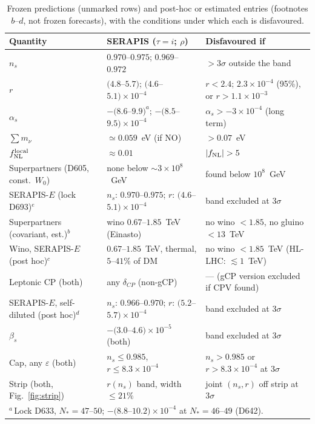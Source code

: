 \documentclass[aps,prd,twocolumn,superscriptaddress,nofootinbib,floatfix]{revtex4-2}
\begin{document}
\begin{table}[tbp]
\caption{Frozen predictions (unmarked rows) and post-hoc or estimated entries (footnotes $b$--$d$, not frozen forecasts), with the conditions under which each is disfavoured.}\label{tab:forward}
\begin{ruledtabular}
\begin{tabular}{lll}
Quantity & SERAPIS ($\tau=i$; $\rho$) & Disfavoured if \\
\hline
$n_s$ & $0.970$--$0.975$; $0.969$--$0.972$ & $>3\sigma$ outside the band \\
$r$ & $(4.8$--$5.7)$; $(4.6$--$5.1)\times10^{-4}$ & $r<2.4$; $2.3\times10^{-4}$ (95\%), or $r>1.1\times10^{-3}$ \\
$\alpha_s$ & $-(8.6$--$9.9)^a$; $-(8.5$--$9.5)\times10^{-4}$ & $\alpha_s>-3\times10^{-4}$ (long term) \\
$\sum m_\nu$ & $\simeq0.059$~eV (if NO) & $>0.07$~eV \\
$f_{\rm NL}^{\rm local}$ & $\approx 0.01$ & $|f_{\rm NL}|>5$ \\
Superpartners (D605, const.\ $W_0$) & none below $\sim3\times10^8$~GeV & found below $10^8$~GeV \\
SERAPIS-$E$ (lock D693)$^e$ & $n_s$: $0.970$--$0.975$; $r$: $(4.6$--$5.1)\times10^{-4}$ & band excluded at $3\sigma$ \\
Superpartners (covariant, est.)$^b$ & wino $0.67$--$1.85$~TeV (Einasto) & no wino $<1.85$, no gluino $<13$~TeV \\
Wino, SERAPIS-$E$ (post hoc)$^c$ & $0.67$--$1.85$~TeV, thermal, $5$--$41\%$ of DM & no wino $<1.85$~TeV (HL-LHC: $\lesssim1$~TeV) \\
Leptonic CP (both) & any $\delta_{CP}$ (non-gCP) & --- (gCP version excluded if CPV found) \\
SERAPIS-$E$, self-diluted (post hoc)$^d$ & $n_s$: $0.966$--$0.970$; $r$: $(5.2$--$5.7)\times10^{-4}$ & band excluded at $3\sigma$ \\
$\beta_s$ & $-(3.0$--$4.6)\times10^{-5}$ (both) & band excluded at $3\sigma$ \\
Cap, any $\varepsilon$ (both) & $n_s\le0.985$, $r\le8.3\times10^{-4}$ & $n_s>0.985$ or $r>8.3\times10^{-4}$ at $3\sigma$ \\
Strip (both, Fig.~\ref{fig:strip}) & $r(n_s)$ band, width $\le21\%$ & joint $(n_s,r)$ off strip at $3\sigma$ \\
\multicolumn{3}{l}{$^a$\,Lock D633, $N_*=47$--$50$; $-(8.8$--$10.2)\times10^{-4}$ at $N_*=46$--$49$ (D642).} \\

\end{tabular}
\end{ruledtabular}
\end{table}
\end{document}
